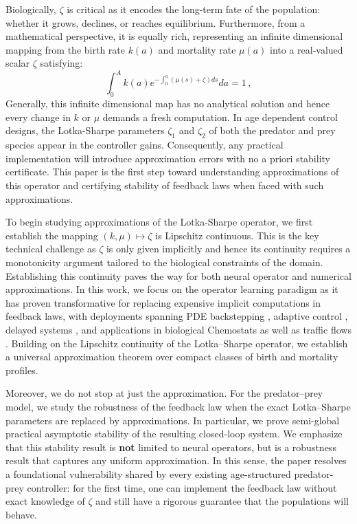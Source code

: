 \documentclass[journal,twoside,web]{ieeecolor}
\begin{document}
Biologically, $\zeta$ is critical as it encodes the long-term fate of the population: whether it grows, declines, or reaches equilibrium. Furthermore, from a mathematical perspective, it is equally rich, representing an infinite dimensional mapping from the birth rate $k(a)$ and mortality rate $\mu(a)$ into a real-valued scalar $\zeta$ satisfying:
\begin{equation}
\label{eq:Lotkasharpe}
    \int_0^A k(a) e^{-\int_0^a(\mu(s) + \zeta)ds} da = 1\,, 
\end{equation}
 Generally, this infinite dimensional map has no analytical solution and hence every change in $k$ or $\mu$ demands a fresh computation. In age dependent control designs, the Lotka-Sharpe parameters $\zeta_1$ and $\zeta_2$ of both the predator and prey species appear in the controller gains. Consequently, any practical implementation will introduce approximation errors with no a priori stability certificate. This paper is the first step toward understanding approximations of this operator and certifying stability of feedback laws when faced with such approximations.

To begin studying approximations of the Lotka-Sharpe operator, we first establish the mapping $(k, \mu) \mapsto \zeta$ is Lipschitz continuous. This is the key technical challenge as $\zeta$ is only given implicitly and hence its continuity requires a monotonicity argument tailored to the biological constraints of the domain. Establishing this continuity paves the way for both neural operator \cite{chen1995Universal, lu2021Learning, li2021Fourier} and numerical approximations. In this work, we focus on the operator learning paradigm as it has proven transformative for replacing expensive implicit computations in feedback laws, with deployments spanning PDE backstepping \cite{10374221, krstic2024Neural, wang2024Backstepping}, adaptive control \cite{lamarque2025Adaptive, lamarque2025Gain, BHAN2025105968}, delayed systems \cite{wang2024Backstepping}, and applications in biological Chemostats \cite{bhan2025stabilizationnonlinearsystemsunknown} as well as traffic flows \cite{pmlr-v242-zhang24c, LYU202513}. Building on the Lipschitz continuity of the Lotka--Sharpe operator, we establish a universal approximation theorem over compact classes of birth and mortality profiles.

Moreover, we do not stop at just the approximation. For the predator--prey model, we study the robustness of the feedback law when the exact Lotka--Sharpe parameters are replaced by approximations. In particular, we prove semi-global practical asymptotic stability of the resulting closed-loop system. We emphasize that this stability result is \textbf{not} limited to neural operators, but is a robustness result that captures any uniform approximation. In this sense, the paper resolves a foundational vulnerability shared by every existing age-structured predator-prey controller: for the first time, one can implement the feedback law without exact knowledge of $\zeta$ and still have a rigorous guarantee that the populations will behave.
\end{document}
